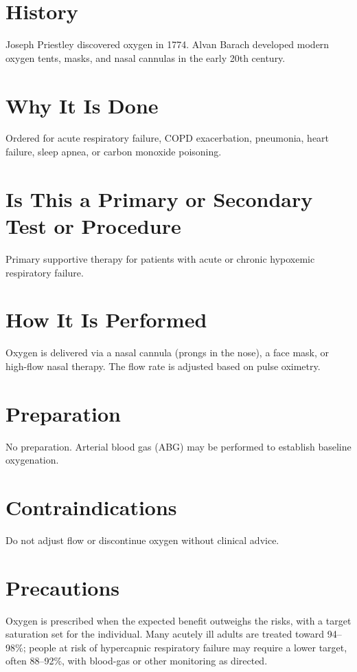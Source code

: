 \section*{History}
Joseph Priestley discovered oxygen in 1774. Alvan Barach developed modern oxygen tents, masks, and nasal cannulas in the early 20th century.

\section*{Why It Is Done}
Ordered for acute respiratory failure, COPD exacerbation, pneumonia, heart failure, sleep apnea, or carbon monoxide poisoning.

\section*{Is This a Primary or Secondary Test or Procedure}
Primary supportive therapy for patients with acute or chronic hypoxemic respiratory failure.

\section*{How It Is Performed}
Oxygen is delivered via a nasal cannula (prongs in the nose), a face mask, or high-flow nasal therapy. The flow rate is adjusted based on pulse oximetry.

\section*{Preparation}
No preparation. Arterial blood gas (ABG) may be performed to establish baseline oxygenation.

\section*{Contraindications}
Do not adjust flow or discontinue oxygen without clinical advice.

\section*{Precautions}
Oxygen is prescribed when the expected benefit outweighs the risks, with a target saturation set for the individual. Many acutely ill adults are treated toward 94--98\%; people at risk of hypercapnic respiratory failure may require a lower target, often 88--92\%, with blood-gas or other monitoring as directed.

